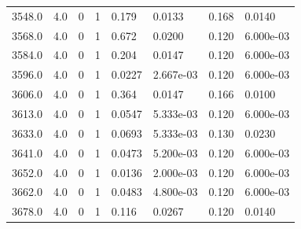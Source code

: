 \documentclass[preview]{standalone}
\begin{document}
{{{{{{{\begin{tabular}{L{1.2cm}C{1.2cm} C{0.3cm}C{0.5cm} C{1.4cm}C{1.4cm} C{1.4cm}C{1.4cm}}
  3548.0  &   4.0  & 0     &  1 &  0.179  & 0.0133  & 0.168 &  0.0140   \\ 
  3568.0  &   4.0  & 0     &  1 &  0.672  & 0.0200  & 0.120 &  6.000e-03   \\ 
  3584.0  &   4.0  & 0     &  1 &  0.204  & 0.0147  & 0.120 &  6.000e-03   \\ 
  3596.0  &   4.0  & 0     &  1 &  0.0227  & 2.667e-03  & 0.120 &  6.000e-03   \\ 
  3606.0  &   4.0  & 0     &  1 &  0.364  & 0.0147  & 0.166 &  0.0100   \\ 
  3613.0  &   4.0  & 0     &  1 &  0.0547  & 5.333e-03  & 0.120 &  6.000e-03   \\ 
  3633.0  &   4.0  & 0     &  1 &  0.0693  & 5.333e-03  & 0.130 &  0.0230   \\ 
  3641.0  &   4.0  & 0     &  1 &  0.0473  & 5.200e-03  & 0.120 &  6.000e-03   \\ 
  3652.0  &   4.0  & 0     &  1 &  0.0136  & 2.000e-03  & 0.120 &  6.000e-03   \\ 
  3662.0  &   4.0  & 0     &  1 &  0.0483  & 4.800e-03  & 0.120 &  6.000e-03   \\ 
  3678.0  &   4.0  & 0     &  1 &  0.116  & 0.0267  & 0.120 &  0.0140   \\ 
\hline 
\end{tabular} 

}}}}}}}
\end{document}
